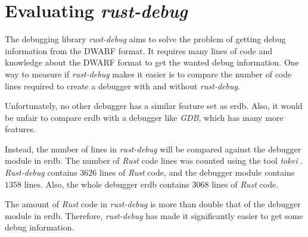 
\section{Evaluating \emph{rust-debug}} \label{sec:evalrd}
The debugging library \emph{rust-debug} aims to solve the problem of getting debug information from the \gls{DWARF} format.
It requires many lines of code and knowledge about the \gls{DWARF} format to get the wanted debug information.
One way to measure if \emph{rust-debug} makes it easier is to compare the number of code lines required to create a debugger with and without \emph{rust-debug}.


Unfortunately, no other debugger has a similar feature set as \gls{erdb}.
Also, it would be unfair to compare \gls{erdb} with a debugger like \emph{GDB}, which has many more features.


Instead, the number of lines in \emph{rust-debug} will be compared against the debugger module in \gls{erdb}.
The number of \emph{Rust} code lines was counted using the tool \emph{tokei} \cite{tokei}.
\emph{Rust-debug} contains $3626$ lines of \emph{Rust} code, and the debugger module contains $1358$ lines.
Also, the whole debugger \gls{erdb} contains $3068$ lines of \emph{Rust} code.


The amount of \emph{Rust} code in \emph{rust-debug} is more than double that of the debugger module in \gls{erdb}.
Therefore, \emph{rust-debug} has made it significantly easier to get some debug information.



